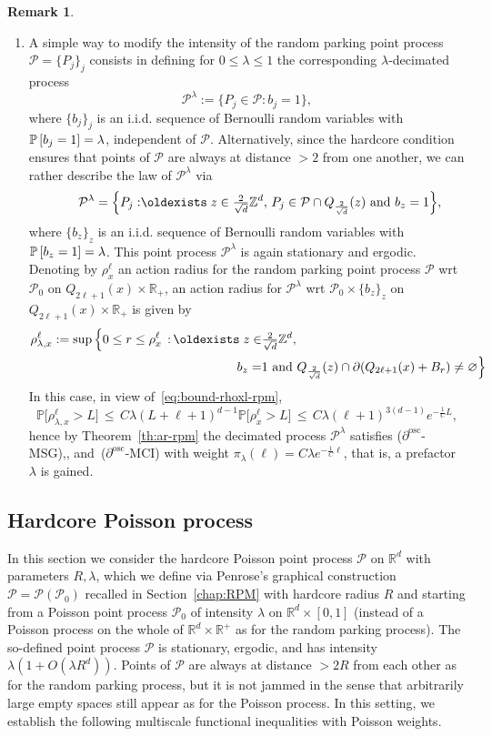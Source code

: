 \documentclass[10pt]{amsart}
\theoremstyle{definition}\newtheorem{defi}[theo]{Definition}\newtheorem{rema}[theo]{Remark}\newtheorem{exam}[theo]{Example}\newtheorem{exem}[theo]{Example}\newtheorem{nota}[theo]{Notation}
\newcommand{\R}{\mathbb R}
\newcommand{\Z}{\mathbb Z}
\newcommand{\pr}[1]{\mathbb{P}\left[#1 \right]}
\newcommand{\prm}[1]{\mathbb{P}\big[#1 \big]}
\newcommand{\Pc}{\mathcal P}
\newcommand{\osc}{\partial^{\mathrm{osc}}}
\renewcommand*{\exists}{\mathrel{\oldexists}}
\begin{document}
\begin{rema}
\begin{enumerate}
\item \label{rema3.4.2}A simple way to modify the intensity of the random parking point process $\Pc=\{P_j\}_j$ consists in defining for $0\le\lambda \le1$ the corresponding $\lambda$-decimated process
\[
\Pc^\lambda:=\{P_j\in\Pc:b_j=1\},
\]
where $\{b_j\}_j$ is an i.i.d. sequence of Bernoulli random variables with $\pr{b_j=1}\linebreak=\lambda$, independent of $\Pc$. Alternatively, since the hardcore condition ensures that points of $\Pc$ are always at distance $>2$ from one another, we can rather describe the law of $\Pc^\lambda$ via
\[
\qquad\Pc^\lambda=\Big\{P_j:\exists z\in\tfrac2{\sqrt d}\Z^d,\, P_j \in\Pc \cap Q_{\frac2{\sqrt{d}}}(z)\text{ and }b_z=1\Big\},
\]
where $\{b_z\}_z$ is an i.i.d. sequence of Bernoulli random variables with $\pr{b_z=1}\linebreak=\lambda$. This point process $\Pc^\lambda$ is again stationary and ergodic. Denoting by $\rho_x^\ell$ an action radius for the random parking point process $\Pc$ wrt $\Pc_0$ on $Q_{2\ell+1}(x)\times\R_+$, an action radius for $\Pc^\lambda$ wrt $\Pc_0\times\{b_z\}_z$ on $Q_{2\ell+1}(x)\times\R_+$ is given by
\begin{align*}
\rho_{\lambda,x}^\ell := \sup\Big\{0\le r\le \rho_x^\ell \,:\, \exists z\in& \tfrac2{\sqrt d} \Z^d,\\
b_z=&1\text{ and }Q_{\frac2{\sqrt{d}}}(z)\cap\partial(Q_{2\ell+1}(x)+B_r)\ne\varnothing\Big\}
\end{align*}
In this case, in view of~\eqref{eq:bound-rhoxl-rpm},
\[
\prm{\rho_{\lambda,x}^\ell>L}\,\le\,C\lambda(L+\ell+1)^{d-1}\prm{\rho_{x}^\ell>L}\,\le\,C\lambda(\ell+1)^{3(d-1)}e^{-\frac1CL},
\]
hence by Theorem~\ref{th:ar-rpm} the decimated process $\Pc^\lambda$ satisfies {($\osc$-MSG)},\linebreak{($\osc$-MLSI)}, and~{($\osc$-MCI)} with weight $\pi_\lambda(\ell)=C\lambda e^{-\frac1{C}\ell}$, that is, a prefactor $\lambda$ is gained.
\qedhere
\end{enumerate}
\end{rema}


\subsection{Hardcore Poisson process}\label{sec:hardcore}
In this section we consider the hardcore Poisson point process $\Pc$ on $\R^d$ with parameters $R,\lambda$, which we define via Penrose's graphical construction $\Pc=\Pc(\Pc_0)$ recalled in Section~\ref{chap:RPM} with hardcore radius $R$ and starting from a Poisson point process $\Pc_0$ of intensity $\lambda$ on $\R^d\times [0,1]$ (instead of a Poisson process on the whole of $\R^d\times\R^+$ as for the random parking process). The so-defined point process $\Pc$ is stationary, ergodic, and has intensity $\lambda(1+O(\lambda R^d))$. Points of $\Pc$ are always at distance $>2R$ from each other as for the random parking process, but it is not jammed in the sense that arbitrarily large empty spaces still appear as for the Poisson process. In this setting, we establish the following multiscale functional inequalities with Poisson weights.
\end{document}
